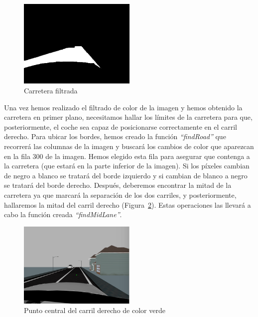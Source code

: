 \begin{figure}[H]
  \begin{center}
    \includegraphics[width=0.5\textwidth]{figures/Stop/road.jpg}
		\caption{Carretera filtrada}
		\label{fig.road}
		\end{center}
\end{figure}

Una vez hemos realizado el filtrado de color de la imagen y hemos obtenido la carretera en primer plano, necesitamos hallar los límites de la carretera para que, posteriormente, el coche sea capaz de posicionarse correctamente en el carril derecho. Para ubicar los bordes, hemos creado la función \textit{``findRoad''} que recorrerá las columnas de la imagen y buscará los cambios de color que aparezcan en la fila 300 de la imagen. Hemos elegido esta fila para asegurar que contenga a la carretera (que estará en la parte inferior de la imagen). Si los píxeles cambian de negro a blanco se tratará del borde izquierdo y si cambian de blanco a negro se tratará del borde derecho. Después, deberemos encontrar la mitad de la carretera ya que marcará la separación de los dos carriles, y posteriormente, hallaremos la mitad del carril derecho (Figura~\ref{fig.desv}). Estas operaciones las llevará a cabo la función creada \textit{``findMidLane''}. \\

\begin{figure}[H]
  \begin{center}
    \includegraphics[width=0.5\textwidth]{figures/Stop/desv.png}
		\caption{Punto central del carril derecho de color verde}
		\label{fig.desv}
		\end{center}
\end{figure}


